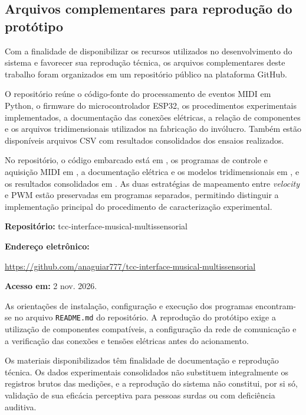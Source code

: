 \begin{apendicesenv}
\chapter{Arquivos complementares para reprodução do protótipo}
\label{ap:arquivos_complementares}

Com a finalidade de disponibilizar os recursos utilizados no desenvolvimento do sistema e favorecer sua reprodução técnica, os arquivos complementares deste trabalho foram organizados em um repositório público na plataforma GitHub.

O repositório reúne o código-fonte do processamento de eventos MIDI em Python, o firmware do microcontrolador ESP32, os procedimentos experimentais implementados, a documentação das conexões elétricas, a relação de componentes e os arquivos tridimensionais utilizados na fabricação do invólucro. Também estão disponíveis arquivos CSV com resultados consolidados dos ensaios realizados.

No repositório, o código embarcado está em , os programas de controle e aquisição MIDI em , a documentação elétrica e os modelos tridimensionais em , e os resultados consolidados em . As duas estratégias de mapeamento entre \textit{velocity} e PWM estão preservadas em programas separados, permitindo distinguir a implementação principal do procedimento de caracterização experimental.

\noindent\textbf{Repositório:} tcc-interface-musical-multissensorial

\noindent\textbf{Endereço eletrônico:}\par
\begingroup\sloppy\noindent\url{https://github.com/anaguiar777/tcc-interface-musical-multissensorial}\par\endgroup

\noindent\textbf{Acesso em:} 2 nov. 2026.

As orientações de instalação, configuração e execução dos programas encontram-se no arquivo \texttt{README.md} do repositório. A reprodução do protótipo exige a utilização de componentes compatíveis, a configuração da rede de comunicação e a verificação das conexões e tensões elétricas antes do acionamento.

Os materiais disponibilizados têm finalidade de documentação e reprodução técnica. Os dados experimentais consolidados não substituem integralmente os registros brutos das medições, e a reprodução do sistema não constitui, por si só, validação de sua eficácia perceptiva para pessoas surdas ou com deficiência auditiva.

\end{apendicesenv}
